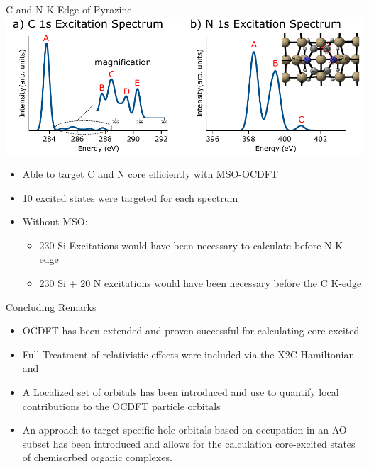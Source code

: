 \documentclass[t]{beamer}
\begin{document}
\begin{frame}{C and N K-Edge of Pyrazine}
\centering
\includegraphics[width=\linewidth]{pyrazine_chemisorbed_c_kedge.pdf}
\begin{itemize}
\item Able to target C and N core efficiently with MSO-OCDFT
\item 10 excited states were targeted for each spectrum
\item Without MSO:
		\begin{itemize}
		\item 230 Si Excitations would have been necessary to calculate before N K-edge
		\item 230 Si + 20 N excitations would have been necessary before the C K-edge
		\end{itemize}
\end{itemize}
\end{frame}

\begin{frame}{Concluding Remarks}
\begin{itemize}
\item OCDFT has been extended and proven successful for calculating core-excited
\item Full Treatment of relativistic effects were included via the X2C Hamiltonian and 
\item A Localized set of orbitals has been introduced and use to quantify local contributions to the OCDFT particle orbitals
\item An approach to target specific hole orbitals based on occupation in an AO subset has been introduced and allows for the calculation core-excited states of chemisorbed organic complexes.
\end{itemize}
\end{frame}
\end{document}
